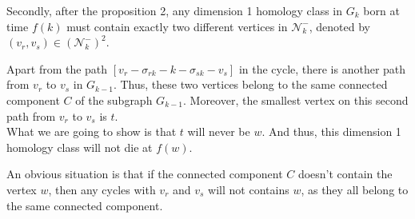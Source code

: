 \documentclass[a4paper,12pt]{article}
\numberwithin{equation}{section}
\begin{document}
	Secondly, after the proposition 2, any dimension 1 homology class in $G_k$ born at time $f(k)$ must contain exactly two different vertices in $\mathcal{N}_k^-$, denoted by $(v_r,v_s) \in (\mathcal{N}_k^-)^2$.
	
	Apart from the path $[v_r - \sigma_{rk} - k - \sigma_{sk} - v_s]$ in the cycle, there is another path from $v_r$ to $v_s$ in $G_{k-1}$. Thus, these two vertices belong to the same connected component $C$ of the subgraph $G_{k-1}$. 
	Moreover, the smallest vertex on this second path from $v_r$ to $v_s$ is $t$.\\
		
	
	What we are going to show is that $t$ will never be $w$. And thus, this dimension 1 homology class will not die at $f(w)$.
	
	An obvious situation is that if the connected component $C$ doesn't contain the vertex $w$, then any cycles with $v_r$ and $v_s$ will not contains $w$, as they all belong to the same connected component.
	
\end{document}
